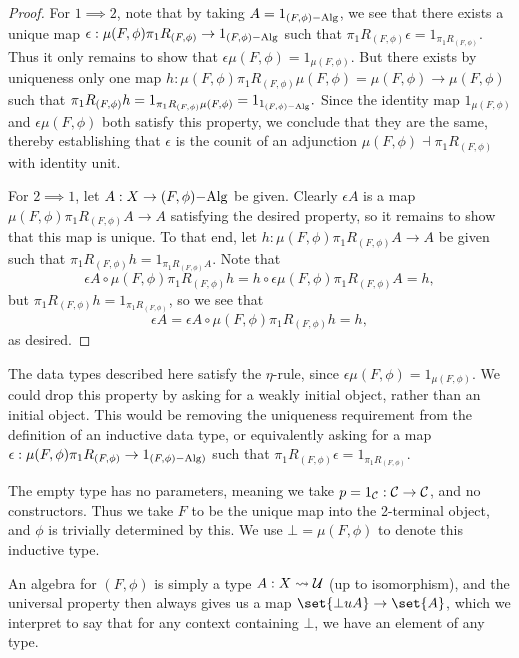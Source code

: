 \documentclass[../thesis.tex]{subfiles}
\begin{document}
\begin{proof}
  For $1 \implies 2$, note that by taking $A = 1_{(F,\phi)\mathrm{-Alg}}$, we see that there exists a unique map $
  \epsilon : \mu(F,\phi)\pi_1R_{(F,\phi)} \to 1_{(F,\phi)\mathrm{-Alg}}$ such that $\pi_1 R_{(F,\phi)}\epsilon =
  1_{\pi_1 R_{(F,\phi)}}$. Thus it only remains to show that $\epsilon\mu(F,\phi) = 1_{\mu(F,\phi)}$. But
  there exists by uniqueness only one map $h : \mu(F,\phi)\pi_1R_{(F,\phi)}\mu(F,\phi) = \mu(F,\phi) \to
  \mu(F,\phi)$ such that $\pi_1 R_{(F,\phi)} h = 1_{\pi_1 R_{(F,\phi)}\mu(F,\phi)} = 1_{1_{(F,\phi)\mathrm{-Alg}}}.$
  Since the identity map $1_{\mu(F,\phi)}$ and $\epsilon\mu(F,\phi)$ both satisfy this property, we conclude
  that they are the same, thereby establishing that $\epsilon$ is the counit of an adjunction $\mu(F,\phi)
  \dashv \pi_1R_{(F,\phi)}$ with identity unit.

  For $2 \implies 1$, let $A : X \to (F,\phi)\mathrm{-Alg}$ be given. Clearly $\epsilon A$ is a map $\mu(F,\phi)\pi_1
  R_{(F,\phi)}A \to A$ satisfying the desired property, so it remains to show that this map is unique. To that
  end, let $h : \mu(F,\phi)\pi_1R_{(F,\phi)}A \to A$ be given such that $\pi_1R_{(F,\phi)}h = 1_{\pi_1R_{(F,
  \phi)}A}$. Note that
  \[\epsilon A \circ \mu(F,\phi) \pi_1 R_{(F,\phi)} h = h \circ \epsilon \mu(F,\phi)\pi_1 R_{(F,\phi)}A = h,\]
  but $\pi_1 R_{(F,\phi)} h = 1_{\pi_1 R_{(F,\phi)}}$, so we see that
  \[\epsilon A = \epsilon A \circ \mu(F,\phi)\pi_1 R_{(F,\phi)} h = h,\]
  as desired.
\end{proof}

\begin{remark}
  The data types described here satisfy the $\eta$-rule, since $\epsilon\mu(F,\phi) = 1_{\mu(F,\phi)}$. We could
  drop this property by asking for a weakly initial object, rather than an initial object. This would be removing
  the uniqueness requirement from the definition of an inductive data type, or equivalently asking for a map
  $\epsilon : \mu(F,\phi)\pi_1R_{(F,\phi)} \to 1_{(F,\phi)\mathrm{-Alg})}$ such that $\pi_1 R_{(F,\phi)}\epsilon =
  1_{\pi_1R_{(F,\phi)}}$.
\end{remark}

\begin{example}
  The empty type has no parameters, meaning we take $p = 1_{\mathcal{C}} : {\mathcal{C}} \to {\mathcal{C}}$, and no constructors. Thus we
  take $F$ to be the unique map into the 2-terminal object, and $\phi$ is trivially determined by this.
  We use $\bot = \mu(F,\phi)$ to denote this inductive type. 

  An algebra for $(F,\phi)$ is simply a type $A : X \rightsquigarrow {\mathcal{U}}$ (up to isomorphism), and the universal property
  then always gives us a map $\set{\bot uA} \to \set{A}$, which we interpret to say that for any context
  containing $\bot$, we have an element of any type.
\end{example}
\end{document}
